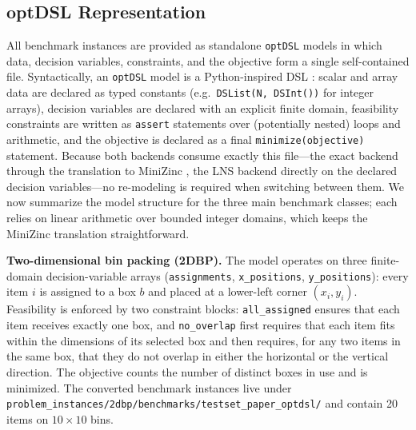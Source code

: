 \documentclass[11pt,a4paper]{article}
\begin{document}
\subsection{optDSL Representation}
All benchmark instances are provided as standalone \texttt{optDSL} models
in which data, decision variables, constraints, and the objective form a
single self-contained file.
Syntactically, an \texttt{optDSL} model is a Python-inspired DSL
\citep{delrio2026optdsl}: scalar and array data are declared as typed
constants (e.g.\ \texttt{DSList(N, DSInt())} for integer arrays), decision
variables are declared with an explicit finite domain, feasibility
constraints are written as \texttt{assert} statements over (potentially
nested) loops and arithmetic, and the objective is declared as a final
\texttt{minimize(objective)} statement.
Because both backends consume exactly this file---the exact backend through
the translation to MiniZinc \citep{delrio2026optdsl}, the LNS backend
directly on the declared decision variables---no re-modeling is required
when switching between them.
We now summarize the model structure for the three main benchmark classes;
each relies on linear arithmetic over bounded integer domains, which keeps
the MiniZinc translation straightforward.

\textbf{Two-dimensional bin packing (2DBP).}
The model operates on three finite-domain decision-variable arrays
(\texttt{assignments}, \texttt{x\_positions}, \texttt{y\_positions}):
every item $i$ is assigned to a box $b$ and placed at a lower-left corner
$(x_i,y_i)$.
Feasibility is enforced by two constraint blocks: \texttt{all\_assigned}
ensures that each item receives exactly one box, and \texttt{no\_overlap}
first requires that each item fits within the dimensions of its selected
box and then requires, for any two items in the same box, that they do not
overlap in either the horizontal or the vertical direction.
The objective counts the number of distinct boxes in use and is minimized.
The converted benchmark instances live under
\texttt{problem\_instances/2dbp/benchmarks/testset\_paper\_optdsl/} and
contain 20 items on $10 \times 10$ bins.
\end{document}
